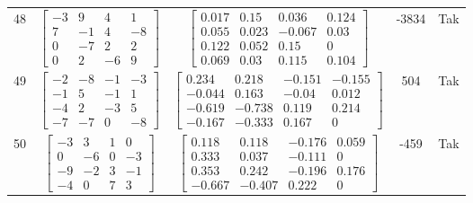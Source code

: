 \documentclass[a4paper,12pt]{article}
\begin{document}
\begin{tabular}{c c c c c}
48
&
$\begin{bmatrix} -3 & 9 & 4 & 1 \\ 7 & -1 & 4 & -8 \\ 0 & -7 & 2 & 2 \\ 0 & 2 & -6 & 9 \end{bmatrix}$
&
$\begin{bmatrix} 0.017 & 0.15 & 0.036 & 0.124 \\ 0.055 & 0.023 & -0.067 & 0.03 \\ 0.122 & 0.052 & 0.15 & 0 \\ 0.069 & 0.03 & 0.115 & 0.104 \end{bmatrix}$
&
-3834
&
Tak
\\
49
&
$\begin{bmatrix} -2 & -8 & -1 & -3 \\ -1 & 5 & -1 & 1 \\ -4 & 2 & -3 & 5 \\ -7 & -7 & 0 & -8 \end{bmatrix}$
&
$\begin{bmatrix} 0.234 & 0.218 & -0.151 & -0.155 \\ -0.044 & 0.163 & -0.04 & 0.012 \\ -0.619 & -0.738 & 0.119 & 0.214 \\ -0.167 & -0.333 & 0.167 & 0 \end{bmatrix}$
&
504
&
Tak
\\
50
&
$\begin{bmatrix} -3 & 3 & 1 & 0 \\ 0 & -6 & 0 & -3 \\ -9 & -2 & 3 & -1 \\ -4 & 0 & 7 & 3 \end{bmatrix}$
&
$\begin{bmatrix} 0.118 & 0.118 & -0.176 & 0.059 \\ 0.333 & 0.037 & -0.111 & 0 \\ 0.353 & 0.242 & -0.196 & 0.176 \\ -0.667 & -0.407 & 0.222 & 0 \end{bmatrix}$
&
-459
&
Tak
\\
\end{tabular} \egroup \newpage
\end{document}
